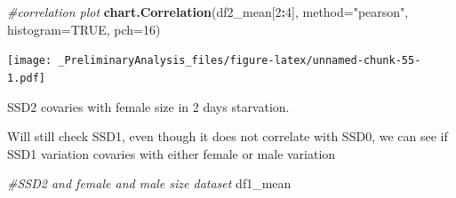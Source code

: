 \documentclass[
]{article}
\newenvironment{Shaded}{\begin{snugshade}}{\end{snugshade}}
\newcommand{\CommentTok}[1]{\textcolor[rgb]{0.56,0.35,0.01}{\textit{#1}}}
\newcommand{\DataTypeTok}[1]{\textcolor[rgb]{0.13,0.29,0.53}{#1}}
\newcommand{\DecValTok}[1]{\textcolor[rgb]{0.00,0.00,0.81}{#1}}
\newcommand{\KeywordTok}[1]{\textcolor[rgb]{0.13,0.29,0.53}{\textbf{#1}}}
\newcommand{\NormalTok}[1]{#1}
\newcommand{\OperatorTok}[1]{\textcolor[rgb]{0.81,0.36,0.00}{\textbf{#1}}}
\newcommand{\OtherTok}[1]{\textcolor[rgb]{0.56,0.35,0.01}{#1}}
\newcommand{\StringTok}[1]{\textcolor[rgb]{0.31,0.60,0.02}{#1}}
\begin{document}
\begin{Shaded}
\begin{Highlighting}[]
\CommentTok{#correlation plot}
\KeywordTok{chart.Correlation}\NormalTok{(df2_mean[}\DecValTok{2}\OperatorTok{:}\DecValTok{4}\NormalTok{],}
                   \DataTypeTok{method=}\StringTok{"pearson"}\NormalTok{,}
                   \DataTypeTok{histogram=}\OtherTok{TRUE}\NormalTok{,}
                   \DataTypeTok{pch=}\DecValTok{16}\NormalTok{)}
\end{Highlighting}
\end{Shaded}

\texttt{[image: \_PreliminaryAnalysis\_files/figure-latex/unnamed-chunk-55-1.pdf]}

SSD2 covaries with female size in 2 days starvation.

Will still check SSD1, even though it does not correlate with SSD0, we
can see if SSD1 variation covaries with either female or male variation

\begin{Shaded}
\begin{Highlighting}[]
\CommentTok{#SSD2 and female and male size dataset}
\NormalTok{df1_mean}
\end{Highlighting}
\end{Shaded}
\end{document}
